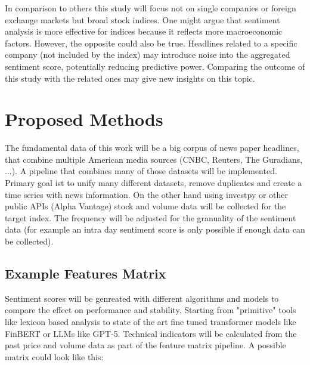 \documentclass[MAI,Projekt,english,IEEE]{twbook}%
\begin{document}
In comparison to others this study will focus not on single companies or foreign exchange markets but broad stock indices. One might argue that sentiment analysis is more effective for indices because it reflects more macroeconomic factors. However, the opposite could also be true. Headlines related to a specific company (not included by the index) may introduce noise into the aggregated sentiment score, potentially reducing predictive power. Comparing the outcome of this study with the related ones may give new insights on this topic.

\chapter{Proposed Methods}
The fundamental data of this work will be a big corpus of news paper headlines, that combine multiple American media sources (CNBC, Reuters, The Guradians, ...). A pipeline that combines many of those datasets will be implemented. Primary goal ist to unify many different datasets, remove duplicates and create a time series with news information.
On the other hand using investpy or other public APIs (Alpha Vantage) stock and volume data will be collected for the target index. The frequency will be adjusted for the granuality of the sentiment data (for example an intra day sentiment score is only possible if enough data can be collected).

\section{Example Features Matrix}
Sentiment scores will be genreated with different algorithms and models to compare the effect on performance and stability. Starting from "primitive" tools like lexicon based analysis to state of the art fine tuned transformer models like FinBERT or LLMs like GPT-5. Technical indicators will be calculated from the past price and volume data as part of the feature matrix pipeline. A possible matrix could look like this:
\end{document}
